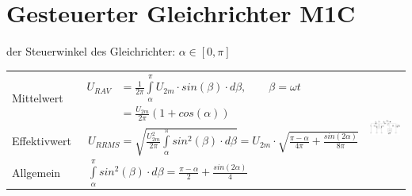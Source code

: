 \section{Gesteuerter Gleichrichter M1C}
der Steuerwinkel des Gleichrichter: $\alpha \in [0, \pi]$


\begin{tabu}{|l|l|p{0.3\textwidth}}
  Mittelwert 
  	& $\begin{aligned}
  		U_{R AV} &= \frac{1}{2\pi}\int\limits_{\alpha}^{\pi}U_{2m} \cdot sin(\beta) \cdot d\beta, \qquad \beta = \omega t\\
  				&= \frac{U_{2m}}{2\pi}(1 + cos(\alpha))
  		\end{aligned}$
  		& \\
  Effektivwert 
  	&\ $U_{R RMS} = \sqrt{\frac{U_{2m}^2}{2\pi}\int\limits_{\alpha}^{\pi}sin^2(\beta) \cdot d\beta} = U_{2m} \cdot \sqrt{\frac{\pi-\alpha}{4\pi}+\frac{sin(2\alpha)}{8\pi}}$ &\\
  Allgemein
  	&\ $\int\limits_{\alpha}^{\pi}sin^2(\beta) \cdot d\beta = \frac{\pi-\alpha}{2}+\frac{sin(2\alpha)}{4}$&\\
\end{tabu}